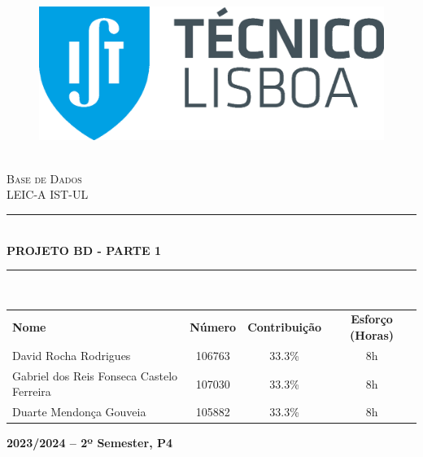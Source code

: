 \documentclass{article}
\newcommand{\HRule}[1]{\rule{\linewidth}{#1}}
\begin{document}
\begin{center}
    \begin{figure}
        \includegraphics[scale = 0.3, left]{img/IST_A.eps} %
        \end{figure}
    \LARGE{ \normalsize \textsc{} \\
    [2.0cm] 
    \LARGE{ \Huge \textsc{Base de Dados}} \\
    [1cm]
    \LARGE{ \LARGE \textsc{LEIC-A IST-UL}} \\
    [1cm]
    \HRule{1.5pt} \\
    [0.4cm]
    \LARGE \textbf{\uppercase{Projeto BD - Parte 1}}
    \HRule{1.5pt}
    \\ [2.5cm]
    }
\end{center}

\vspace{0.5cm}
\begin{center}
\begin{tabular}{ l c c c}
\textbf{Nome} & \textbf{Número} & \textbf{Contribuição} & \textbf{Esforço (Horas)} \\
 David Rocha Rodrigues & 106763 & 33.3\% & 8h \\
 Gabriel dos Reis Fonseca Castelo Ferreira & 107030  & 33.3\% & 8h \\
 Duarte Mendonça Gouveia & 105882 & 33.3\% & 8h
\end{tabular}
\end{center}

\begin{center}
    \vspace{3.5cm}
    \date \large \bf  2023/2024 -- 2º Semester, P4
\end{center}


\setcounter{page}{0}
\thispagestyle{empty}
\end{document}
